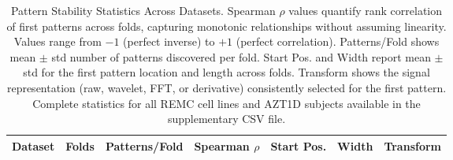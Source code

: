 \begin{table}[H]
\centering
\caption{Pattern Stability Statistics Across Datasets.
Spearman $\rho$ values quantify rank correlation of first patterns across folds,
capturing monotonic relationships without assuming linearity.
Values range from $-1$ (perfect inverse) to $+1$ (perfect correlation).
Patterns/Fold shows mean $\pm$ std number of patterns discovered per fold.
Start Pos. and Width report mean $\pm$ std for the first pattern location and
length across folds. Transform shows the signal representation (raw, wavelet, FFT,
or derivative) consistently selected for the first pattern. Complete statistics for
all REMC cell lines and AZT1D subjects available in the supplementary CSV file.}
\label{tab:pattern_stability}
\footnotesize
\begin{tabular}{lcccccc}
\toprule
\textbf{Dataset} & \textbf{Folds} & \textbf{Patterns/Fold} & \textbf{Spearman $\rho$} & \textbf{Start Pos.} & \textbf{Width} & \textbf{Transform} \\
\midrule
\bottomrule
\end{tabular}
\end{table}